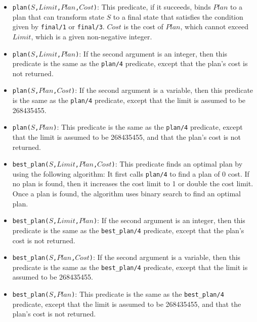 \begin{itemize}
\item \texttt{plan($S$,$Limit$,$Plan$,$Cost$)}: This predicate, if it succeeds, binds $Plan$ to a plan that can transform state $S$ to a final state that satisfies the condition given by {\tt final/1} or {\tt final/3}. $Cost$ is the cost of $Plan$, which cannot exceed $Limit$, which is a given non-negative integer. 

\item \texttt{plan($S$,$Limit$,$Plan$)}: If the second argument is an integer, then this predicate is the same as the \texttt{plan/4} predicate, except that the plan's cost is not returned. 

\item \texttt{plan($S$,$Plan$,$Cost$)}: If the second argument is a variable, then this predicate is the same as the \texttt{plan/4} predicate, except that the limit is assumed to be 268435455.

\item \texttt{plan($S$,$Plan$)}: This predicate is the same as the \texttt{plan/4} predicate, except that the limit is assumed to be 268435455, and that the plan's cost is not returned.

\item \texttt{best\_plan($S$,$Limit$,$Plan$,$Cost$)}: This predicate finds an optimal plan by using the following algorithm:  It first calls {\tt plan/4} to find a plan of 0 cost. If no plan is found, then it increases the cost limit to 1 or double the cost limit. Once a plan is found, the algorithm uses binary search to find an optimal plan.

\item \texttt{best\_plan($S$,$Limit$,$Plan$)}: If the second argument is an integer, then this predicate is the same as the \texttt{best\_plan/4} predicate, except that the plan's cost is not returned. 

\item \texttt{best\_plan($S$,$Plan$,$Cost$)}: If the second argument is a variable, then this predicate is the same as the \texttt{best\_plan/4} predicate, except that the limit is assumed to be 268435455.

\item \texttt{best\_plan($S$,$Plan$)}: This predicate is the same as the \texttt{best\_plan/4} predicate, except that the limit is assumed to be 268435455, and that the plan's cost is not returned.


\end{itemize}
